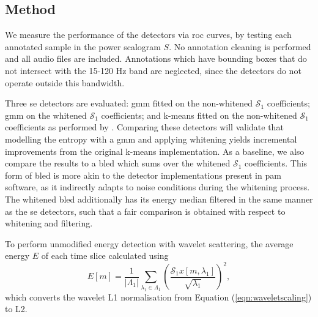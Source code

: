 {%


\subsection{Method}

We measure the performance of the detectors via \ac{roc} curves, by testing each annotated sample in the power scalogram $S$. No annotation cleaning is performed and all audio files are included. Annotations which have bounding boxes that do not intersect with the 15-120 Hz band are neglected, since the detectors do not operate outside this bandwidth.

Three \ac{se} detectors are evaluated: \ac{gmm} fitted on the non-whitened $\mathcal{S}_1$ coefficients; \ac{gmm} on the whitened $\mathcal{S}_1$ coefficients; and k-means fitted on the non-whitened $\mathcal{S}_1$ coefficients as performed by \citet{mypaper}. Comparing these detectors will validate that modelling the entropy with a \ac{gmm} and applying whitening yields incremental improvements from the original k-means implementation. As a baseline, we also compare the results to a \ac{bled} which sums over the whitened $\mathcal{S}_1$ coefficients. This form of \ac{bled} is more akin to the detector implementations present in \ac{pam} software, as it indirectly adapts to noise conditions during the whitening process. The whitened \ac{bled} additionally has its energy median filtered in the same manner as the \ac{se} detectors, such that a fair comparison is obtained with respect to whitening and filtering.

To perform unmodified energy detection with wavelet scattering, the average energy $E$ of each time slice calculated using
\begin{equation}
\label{eqn:bled_power}
    E[m] = \frac{1}{\left| \Lambda_1 \right|}\sum_{\lambda_1 \in \Lambda_1} \left(\frac{\mathcal{S}_1 x [m, \lambda_1]}{\sqrt{\lambda_1}}\right)^2,
\end{equation}
which converts the wavelet L1 normalisation from Equation (\ref{eqn:waveletscaling}) to L2. 

}
